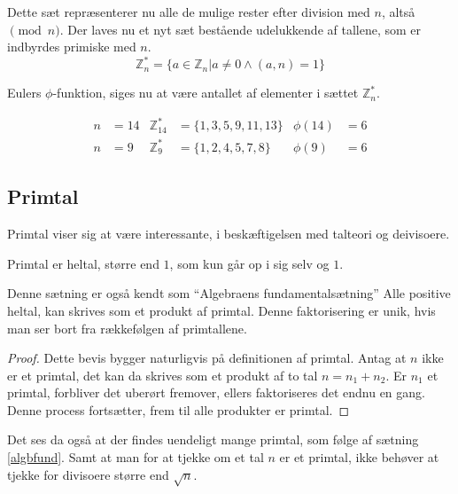     Dette sæt repræsenterer nu alle de mulige rester efter division med \(n\), altså \(\pmod{n}\).
    Der laves nu et nyt sæt bestående udelukkende af tallene, som er indbyrdes primiske med \(n\).
    \[\mathbb{Z}_n^* = \{a \in \mathbb{Z}_n | a \neq 0 \land (a, n) = 1\}\]

    Eulers \(\phi\)-funktion, siges nu at være antallet af elementer i sættet \(\mathbb{Z}_n^*\).

    \begin{eks}
        \mbox{}\vspace*{-1.5em}
        \begin{align*}
            n &= 14 & \mathbb{Z}_{14}^*  &= \{1, 3, 5, 9, 11, 13 \} & \phi(14) &= 6\\
            n &= 9  & \mathbb{Z}_9^*     &= \{1, 2, 4, 5, 7, 8\}    & \phi(9)  &= 6
        \end{align*}
    \end{eks}






    \subsection{Primtal}
    Primtal viser sig at være interessante, i beskæftigelsen med talteori og deivisoere.

    \begin{definition}[Primtal]
        Primtal er heltal, større end \(1\), som kun går op i sig selv og \(1\).
    \end{definition}




    \begin{sent}%
        Denne sætning er også kendt som ``Algebraens fundamentalsætning''
        Alle positive heltal, kan skrives som et produkt af primtal.
        Denne faktorisering er unik, hvis man ser bort fra rækkefølgen af primtallene.
        \label{algbfund}
    \end{sent}

    \begin{proof}
        Dette bevis bygger naturligvis på definitionen af primtal.
        Antag at \(n\) ikke er et primtal, det kan da skrives som et produkt af to tal \(n = n_1 + n_2\).
        Er \(n_1\) et primtal, forbliver det uberørt fremover, ellers faktoriseres det endnu en gang.
        Denne process fortsætter, frem til alle produkter er primtal.
    \end{proof}

    Det ses da også at der findes uendeligt mange primtal, som følge af sætning \ref{algbfund}.
    Samt at man for at tjekke om et tal \(n\) er et primtal, ikke behøver at tjekke for divisoere større end \(\sqrt{n}\).
